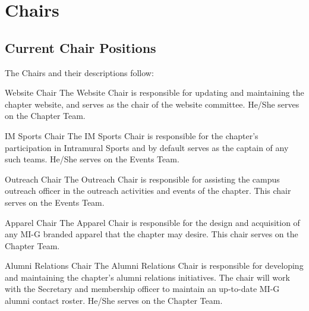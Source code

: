 \chapter{Chairs}\label{sec:Chairs} 
\section{Current Chair Positions} The Chairs and their descriptions follow:\\
\begin{enumsubsection}
\item{Website Chair} The Website Chair is responsible for updating and maintaining the chapter website, and serves as the chair of the website committee. He/She serves on the Chapter Team.
\item{IM Sports Chair} The IM Sports Chair is responsible for the chapter's participation in Intramural Sports and by default serves as the captain of any such teams. He/She serves on the Events Team.
\item{Outreach Chair} The Outreach Chair is responsible for assisting the
campus outreach officer in the outreach activities and events of the chapter. This chair serves on the Events Team.
\item{Apparel Chair} The Apparel Chair is responsible for the design and acquisition of any MI-G branded apparel that the chapter may desire. This chair serves on the Chapter Team.
\item{Alumni Relations Chair} The Alumni Relations Chair is responsible for developing and maintaining the chapter's alumni relations initiatives. The chair will work with the Secretary and membership officer to maintain an up-to-date MI-G alumni contact roster. He/She serves on the Chapter Team.
\end{enumsubsection}